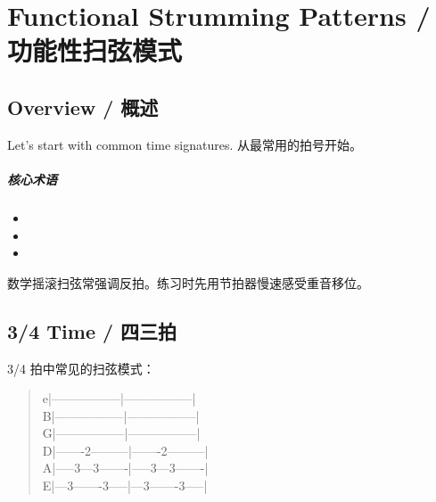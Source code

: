 \chapter{Functional Strumming Patterns / 功能性扫弦模式}
\label{ch:strumming}

\section{Overview / 概述}



\enandcn
  {Let's start with common time signatures.}
  {从最常用的拍号开始。}

\paragraph{核心术语}
\begin{itemize}[leftmargin=*]
  \item {}
  \item {}
  \item {}
\end{itemize}

\begin{notebox}[提示]
  数学摇滚扫弦常强调反拍。练习时先用节拍器慢速感受重音移位。
\end{notebox}

\section{3/4 Time / 四三拍}

\begin{examplebox}[3/4 扫弦模式]
  3/4 拍中常见的扫弦模式：
\end{examplebox}

\begin{verse}
  \small\ttfamily
  e|-----------------|-----------------|\\
  B|-----------------|-----------------|\\
  G|-----------------|-----------------|\\
  D|-------2---------|-------2---------|\\
  A|-----3---3-------|-----3---3-------|\\
  E|---3-------3-----|---3-------3-----|\\
\end{verse}

